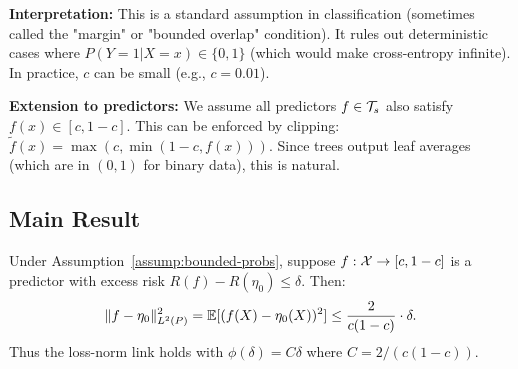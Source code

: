 \documentclass[12pt]{article}
\begin{document}
\textbf{Interpretation:} This is a standard assumption in classification (sometimes called the "margin" or "bounded overlap" condition). It rules out deterministic cases where $P(Y=1|X=x) \in \{0,1\}$ (which would make cross-entropy infinite). In practice, $c$ can be small (e.g., $c = 0.01$).

\textbf{Extension to predictors:} We assume all predictors $f \in \mathcal{T}_s$ also satisfy $f(x) \in [c, 1-c]$. This can be enforced by clipping: $\tilde{f}(x) = \max(c, \min(1-c, f(x)))$. Since trees output leaf averages (which are in $(0,1)$ for binary data), this is natural.

\subsection{Main Result}

\begin{lemma}
\label{lem:ce-loss-norm}
Under Assumption~\ref{assump:bounded-probs}, suppose $f: \mathcal{X} \to [c, 1-c]$ is a predictor with excess risk $R(f) - R(\eta_0) \le \delta$. Then:
\[
\|f - \eta_0\|_{L^2(P)}^2 = \mathbb{E}[(f(X) - \eta_0(X))^2] \le \frac{2}{c(1-c)} \cdot \delta.
\]
Thus the loss-norm link holds with $\phi(\delta) = C\delta$ where $C = 2/(c(1-c))$.
\end{lemma}
\end{document}
